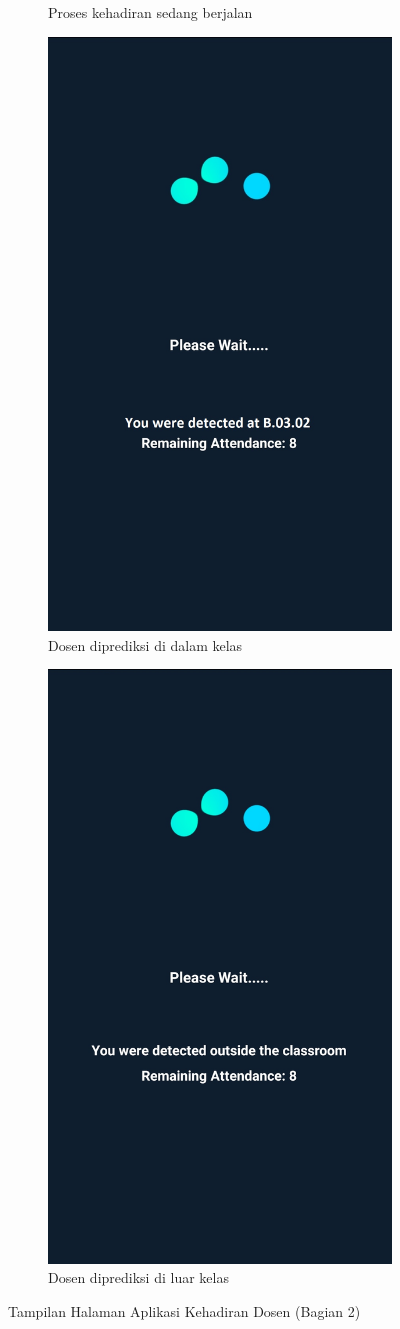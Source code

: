 \begin{enumerate}[a.]
\begin{figure} [H]
\begin{subfigure}{.5\textwidth}
			      \caption{Proses kehadiran sedang berjalan}
		      \end{subfigure}
		      \vspace{1cm}
		      \newline
		      \begin{subfigure}{.5\textwidth}
			      \centering
			      \includegraphics[width=.5\linewidth]{gambar/android/dosen-7}
			      \caption{Dosen diprediksi di dalam kelas}
		      \end{subfigure}
		      \begin{subfigure}{.5\textwidth}
			      \centering
			      \includegraphics[width=.5\linewidth]{gambar/android/dosen-8}
			      \caption{Dosen diprediksi di luar kelas}
		      \end{subfigure}
		      \vspace{0.5cm}
		      \caption{Tampilan Halaman Aplikasi Kehadiran Dosen (Bagian 2)}
		      \label{aplikasidosenbagian2}
	      \end{figure}


\end{enumerate}
